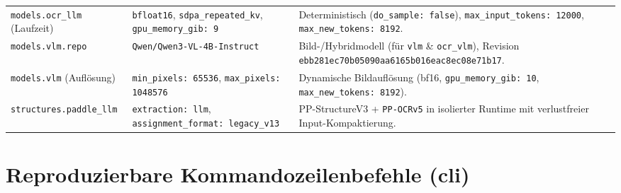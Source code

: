 \begin{table}[htbp]
\begin{tabularx}{\textwidth}{@{}>{\raggedright\arraybackslash}p{} >{\raggedright\arraybackslash}p{} >{\raggedright\arraybackslash}X@{}}
    \addlinespace[2pt]
    \texttt{models.ocr\_llm} (Laufzeit) & \texttt{bfloat16}, \texttt{sdpa\_repeated\_kv}, \texttt{gpu\_memory\_gib: 9} & Deterministisch (\texttt{do\_sample: false}), \texttt{max\_input\_tokens: 12000}, \texttt{max\_new\_tokens: 8192}. \\
    \addlinespace[2pt]
    \texttt{models.vlm.repo} & \texttt{Qwen/\allowbreak Qwen3-VL-4B-Instruct} & Bild-/Hybridmodell (für \texttt{vlm} \& \texttt{ocr\_vlm}), Revision \texttt{ebb281ec70b05090aa61\allowbreak 65b016eac8ec08e71b17}. \\
    \addlinespace[2pt]
    \texttt{models.vlm} (Auflösung) & \texttt{min\_pixels: 65536}, \texttt{max\_pixels: 1048576} & Dynamische Bildauflösung (\ac{bf16}, \texttt{gpu\_memory\_gib: 10}, \texttt{max\_new\_tokens: 8192}). \\
    \addlinespace[2pt]
    \texttt{structures.paddle\_llm} & \texttt{extraction: llm}, \texttt{assignment\_format: legacy\_v13} & PP-StructureV3 + \texttt{PP-OCRv5} in isolierter Runtime mit verlustfreier Input-Kompaktierung. \\
    \bottomrule
  \end{tabularx}
\end{table}

\section{Reproduzierbare Kommandozeilenbefehle (\texorpdfstring{\ac{cli}}{CLI})}
\label{app:cli-befehle}


